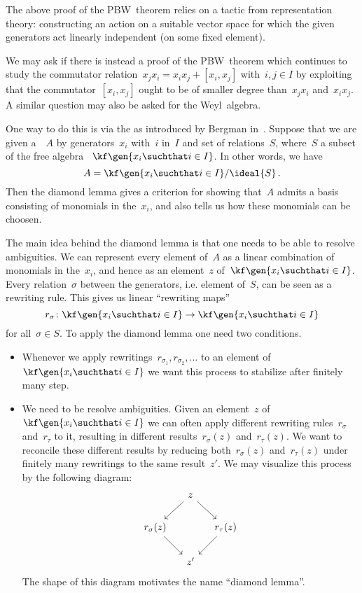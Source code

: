 \begin{remark}
	The above proof of the PBW~theorem relies on a tactic from representation theory:
	constructing an action on a suitable vector space for which the given generators act linearly independent (on some fixed element).

	We may ask if there is instead a proof of the PBW~theorem which continues to study the commutator relation~$x_j x_i = x_i x_j + [x_i, x_j]$ with~$i, j \in I$ by exploiting that the commutator~$[x_i, x_j]$ ought to be of smaller degree than~$x_j x_i$ and~$x_i x_j$.
	A similar question may also be asked for the Weyl~algebra.
	
	One way to do this is via the  as introduced by Bergman in~\cite{diamond_lemma}.
	Suppose that we are given a~\algebra{$\kf$}~$A$ by generators~$x_i$ with~$i$ in~$I$ and set of relations~$S$, where~$S$ a subset of the free algebra ~$\kf\gen{x_i \suchthat i \in I}$.
	In other words, we have
	\[
		A
		=
		\kf\gen{x_i \suchthat i \in I}
		/
		\ideal{ S } \,.
	\]
	Then the diamond lemma gives a criterion for showing that~$A$ admits a basis consisting of monomials in the~$x_i$, and also tells us how these monomials can be choosen.
	
	The main idea behind the diamond lemma is that one needs to be able to resolve ambiguities.
	We can represent every element of~$A$ as a linear combination of monomials in the~$x_i$, and hence as an element~$z$ of~$\kf\gen{x_i \suchthat i \in I}$.
	Every relation~$\sigma$ between the generators, i.e. element of~$S$, can be seen as a rewriting rule.
	This gives us linear \enquote{rewriting maps}
	\[
		r_\sigma
		\colon
		\kf\gen{x_i \suchthat i \in I}
		\to
		\kf\gen{x_i \suchthat i \in I}
	\]
	for all~$\sigma \in S$.
	To apply the diamond lemma one need two conditions.
	\begin{itemize}
		\item
			Whenever we apply rewritings~$r_{\sigma_1}, r_{\sigma_2}, \dotsc$ to an element of~$\kf\gen{x_i \suchthat i \in I}$ we want this process to stabilize after finitely many step.
		\item
			We need to be resolve ambiguities.
			Given an element~$z$ of~$\kf\gen{x_i \suchthat i \in I}$ we can often apply different rewriting rules~$r_\sigma$ and~$r_\tau$ to it, resulting in different results~$r_\sigma(z)$ and~$r_\tau(z)$.
			We want to reconcile these different results by reducing both~$r_\sigma(z)$ and~$r_\tau(z)$ under finitely many rewritings to the same result~$z'$.
			We may visualize this process by the following diagram:
			\[
				\begin{tikzcd}[column sep = small]
					{}
					&
					z
					\arrow{dl}
					\arrow{dr}
					&
					{}
					\\
					r_\sigma(z)
					\arrow{dr}
					&
					{}
					&
					r_\tau(z)
					\arrow{dl}
					\\
					{}
					&
					z'
					&
					{}
				\end{tikzcd}
			\]
			The shape of this diagram motivates the name \enquote{diamond lemma}.
	\end{itemize}
	

\end{remark}
